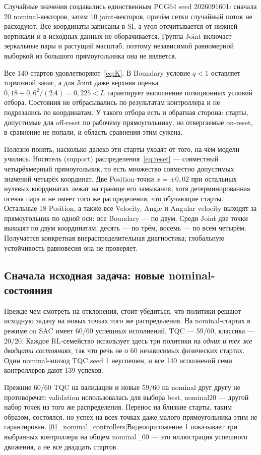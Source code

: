 Случайные значения создавались единственным PCG64 seed 2026091601: сначала 20 nominal-векторов, затем 10 joint-векторов, причём сетки случайный поток не расходуют. Все координаты записаны в SI, а угол отсчитывается от нижней вертикали и в исходных данных не оборачивается. Группа Joint включает зеркальные пары и растущий масштаб, поэтому независимой равномерной выборкой из большого прямоугольника она не является.

Все 140 стартов удовлетворяют~\eqref{eq:K}. В Boundary условие $q<1$ оставляет тормозной запас, а для Joint даже верхняя оценка $0{,}18+0{,}6^2/(2A)=0{,}225<L$ гарантирует выполнение позиционных условий отбора. Состояния не отбрасывались по результатам контроллера и не подрезались по координатам. У такого отбора есть и обратная сторона: старты, допустимые для off-reset по рабочему прямоугольнику, но отвергаемые on-reset, в сравнение не попали, и область сравнения этим сужена.

Полезно понять, насколько далеко эти старты уходят от того, на чём модели учились. Носитель (support) распределения~\eqref{eq:reset} — совместный четырёхмерный прямоугольник, то есть множество совместно допустимых значений четырёх координат. Две Position-точки $x=\pm0{,}02$ при остальных нулевых координатах лежат на границе его замыкания, хотя детерминированная осевая пара и не имеет того же распределения, что обучающие старты. Остальные 18 Position, а также все Velocity, Angle и Angular velocity выходят за прямоугольник по одной оси; все Boundary — по двум. Среди Joint две точки выходят по двум координатам, десять — по трём, восемь — по всем четырём. Получается конкретная внераспределительная диагностика; глобальную устойчивость равновесия она не проверяет.

\subsection{Сначала исходная задача: новые nominal-состояния}
Прежде чем смотреть на отклонения, стоит убедиться, что политики решают исходную задачу на новых точках того же распределения. На nominal-стартах в режиме on SAC имеет 60/60 успешных исполнений, TQC — 59/60, классика — 20/20. Каждое RL-семейство использует здесь три политики на \emph{одних и тех же двадцати состояниях}, так что речь не о 60 независимых физических стартах. Один nominal-эпизод TQC seed 1 неуспешен, и все 140 исполнений семи контроллеров дают 139 успехов.

Прежние 60/60 TQC на валидации и новые 59/60 на nominal друг другу не противоречат: validation использовалась для выбора best, nominal20 — другой набор точек из того же распределения. Перенос на близкие старты, таким образом, состоялся, но успех на всех точках даже малого прямоугольника этим не гарантирован.
\vref{01_nominal_controllers}{Видеоприложение 1} показывает три выбранных контроллера на общем nominal\_00 — это иллюстрация успешного движения, а не все двадцать стартов.

